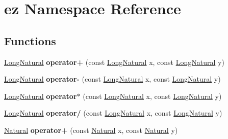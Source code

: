 \hypertarget{namespaceez}{}\section{ez Namespace Reference}
\label{namespaceez}
\subsection*{Functions}
\begin{DoxyCompactItemize}
\item 
\mbox{\label{namespaceez_aa271a938b8ca020409212fd094e7d3cb}} 
\hyperlink{classez_1_1objects_1_1LongNatural}{Long\+Natural} {\bfseries operator+} (const \hyperlink{classez_1_1objects_1_1LongNatural}{Long\+Natural} x, const \hyperlink{classez_1_1objects_1_1LongNatural}{Long\+Natural} y)
\item 
\mbox{\label{namespaceez_a52241ddf601581ed951024e70c0892d1}} 
\hyperlink{classez_1_1objects_1_1LongNatural}{Long\+Natural} {\bfseries operator-\/} (const \hyperlink{classez_1_1objects_1_1LongNatural}{Long\+Natural} x, const \hyperlink{classez_1_1objects_1_1LongNatural}{Long\+Natural} y)
\item 
\mbox{\label{namespaceez_a8fd63e4ef31ec5645f78e0bc9cc32542}} 
\hyperlink{classez_1_1objects_1_1LongNatural}{Long\+Natural} {\bfseries operator$\ast$} (const \hyperlink{classez_1_1objects_1_1LongNatural}{Long\+Natural} x, const \hyperlink{classez_1_1objects_1_1LongNatural}{Long\+Natural} y)
\item 
\mbox{\label{namespaceez_a4f5fd8d83d37d4f9312d7091c18dd52c}} 
\hyperlink{classez_1_1objects_1_1LongNatural}{Long\+Natural} {\bfseries operator/} (const \hyperlink{classez_1_1objects_1_1LongNatural}{Long\+Natural} x, const \hyperlink{classez_1_1objects_1_1LongNatural}{Long\+Natural} y)
\item 
\mbox{\label{namespaceez_a0c769b4066a128a8ce1863a05b7469b8}} 
\hyperlink{classez_1_1objects_1_1Natural}{Natural} {\bfseries operator+} (const \hyperlink{classez_1_1objects_1_1Natural}{Natural} x, const \hyperlink{classez_1_1objects_1_1Natural}{Natural} y)
\item 
\mbox{\label{namespaceez_a59376283467a0b3d6576d1b4335b7a45}} 

\end{DoxyCompactItemize}
